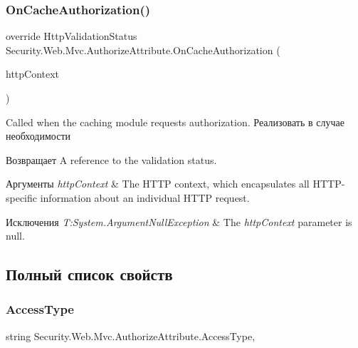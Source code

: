 \subsubsection{\texorpdfstring{On\+Cache\+Authorization()}{OnCacheAuthorization()}}
{\footnotesize\ttfamily override Http\+Validation\+Status Security.\+Web.\+Mvc.\+Authorize\+Attribute.\+On\+Cache\+Authorization (\begin{DoxyParamCaption}\item[{Http\+Context\+Base}]{http\+Context }\end{DoxyParamCaption})\hspace{0.3cm}{\ttfamily [protected]}}



Called when the caching module requests authorization. Реализовать в случае необходимости 

\begin{DoxyReturn}{Возвращает}
A reference to the validation status. 
\end{DoxyReturn}

\begin{DoxyParams}{Аргументы}
{\em http\+Context} & The H\+T\+TP context, which encapsulates all H\+T\+T\+P-\/specific information about an individual H\+T\+TP request.\\
\hline
\end{DoxyParams}

\begin{DoxyExceptions}{Исключения}
{\em T\+:\+System.\+Argument\+Null\+Exception} & The {\itshape http\+Context}  parameter is null.\\
\hline
\end{DoxyExceptions}


\subsection{Полный список свойств}
\mbox{\label{class_security_1_1_web_1_1_mvc_1_1_authorize_attribute_a7bc431c58d3c8410ba8d3e32972eca39}} 
\subsubsection{\texorpdfstring{Access\+Type}{AccessType}}
{\footnotesize\ttfamily string Security.\+Web.\+Mvc.\+Authorize\+Attribute.\+Access\+Type\hspace{0.3cm}{\ttfamily [get]}, {\ttfamily [set]}}



